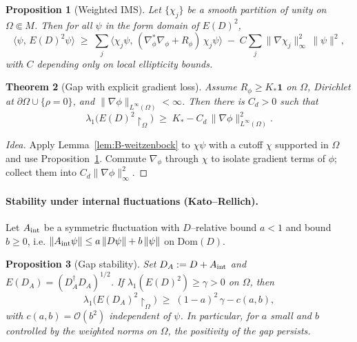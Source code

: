 \documentclass[11pt]{article}
\newtheorem{theorem}{Theorem}[section]
\newtheorem{proposition}[theorem]{Proposition}
\theoremstyle{definition}
\begin{document}
    \begin{proposition}[Weighted IMS]\label{prop:B-ims}
    	Let $\{\chi_j\}$ be a smooth partition of unity on $\Omega\Subset M$.
    	Then for all $\psi$ in the form domain of $E(D)^2$,
    	\[
    	\langle \psi,\,E(D)^2\psi\rangle \;\ge\; 
    	\sum_j \langle \chi_j\psi,\,(\nabla_\phi^\ast\nabla_\phi +R_\phi)\,\chi_j\psi\rangle
    	\;-\; C\sum_j \|\nabla\chi_j\|_\infty^2\,\|\psi\|^2,
    	\]
    	with $C$ depending only on local ellipticity bounds.
    \end{proposition}
    
    \begin{theorem}[Gap with explicit gradient loss]\label{thm:B-gap}
    	Assume $R_\phi\ge K_\ast\mathbf{1}$ on $\Omega$, Dirichlet at $\partial\Omega\cup\{\rho=0\}$, and $\|\nabla\phi\|_{L^\infty(\Omega)}<\infty$.
    	Then there is $C_d>0$ such that
    	\[
    	\lambda_1\big(E(D)^2\!\restriction_\Omega\big)\;\ge\;K_\ast - C_d\,\|\nabla\phi\|_{L^\infty(\Omega)}^2.
    	\]
    \end{theorem}
    
    \begin{proof}[Idea]
    	Apply Lemma~\ref{lem:B-weitzenbock} to $\chi\psi$ with a cutoff $\chi$ supported in $\Omega$ and use Proposition~\ref{prop:B-ims}. 
    	Commute $\nabla_\phi$ through $\chi$ to isolate gradient terms of $\phi$; collect them into $C_d\|\nabla\phi\|_\infty^2$.
    \end{proof}
    
    \paragraph{Stability under internal fluctuations (Kato--Rellich).}
    Let $A_{\rm int}$ be a symmetric fluctuation with $D$–relative bound $a<1$ and bound $b\ge 0$, i.e.
    $\|A_{\rm int}\psi\|\le a\,\|D\psi\|+b\,\|\psi\|$ on $\mathrm{Dom}(D)$.
    
    \begin{proposition}[Gap stability]\label{prop:B-kato}
    	Set $D_A:=D+A_{\rm int}$ and $E(D_A)=(D_A^\dagger D_A)^{1/2}$.
    	If $\lambda_1(E(D)^2)\ge \gamma>0$ on $\Omega$, then
    	\[
    	\lambda_1\big(E(D_A)^2\!\restriction_\Omega\big)\;\ge\; (1-a)^2\,\gamma - c(a,b),
    	\]
    	with $c(a,b)=\mathcal{O}(b^2)$ independent of $\psi$.
    	In particular, for $a$ small and $b$ controlled by the weighted norms on $\Omega$, the positivity of the gap persists.
    \end{proposition}
    
\end{document}
